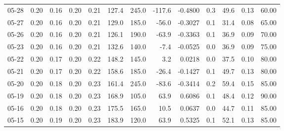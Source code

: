 \begin{threeparttable}
{\begin{tabular}{lrrrrrrrrrrrr}
  05-28 &          0.20 &          0.16 &          0.20 &        0.21 &               127.4 &               245.0 &     -117.6 &      -0.4800 &                 0.3 &             49.6 &            0.13 &                  60.00 \\
  05-27 &          0.20 &          0.16 &          0.20 &        0.21 &               129.0 &               185.0 &      -56.0 &      -0.3027 &                 0.1 &             31.4 &            0.08 &                  65.00 \\
  05-26 &          0.20 &          0.16 &          0.20 &        0.21 &               126.1 &               190.0 &      -63.9 &      -0.3363 &                 0.1 &             36.9 &            0.09 &                  70.00 \\
  05-23 &          0.20 &          0.16 &          0.20 &        0.21 &               132.6 &               140.0 &       -7.4 &      -0.0525 &                 0.0 &             36.9 &            0.09 &                  75.00 \\
  05-22 &          0.20 &          0.17 &          0.20 &        0.22 &               148.2 &               145.0 &        3.2 &       0.0218 &                 0.0 &             37.5 &            0.10 &                  80.00 \\
  05-21 &          0.20 &          0.17 &          0.20 &        0.22 &               158.6 &               185.0 &      -26.4 &      -0.1427 &                 0.1 &             49.7 &            0.13 &                  80.00 \\
  05-20 &          0.20 &          0.18 &          0.20 &        0.23 &               161.4 &               245.0 &      -83.6 &      -0.3414 &                 0.2 &             59.4 &            0.15 &                  85.00 \\
  05-19 &          0.20 &          0.18 &          0.20 &        0.23 &               168.9 &               105.0 &       63.9 &       0.6086 &                 0.1 &             48.4 &            0.12 &                  90.00 \\
  05-16 &          0.20 &          0.18 &          0.20 &        0.23 &               175.5 &               165.0 &       10.5 &       0.0637 &                 0.0 &             44.7 &            0.11 &                  85.00 \\
  05-15 &          0.20 &          0.19 &          0.20 &        0.23 &               183.9 &               120.0 &       63.9 &       0.5325 &                 0.1 &             52.1 &            0.13 &                  85.00 \\

\end{tabular}}
\end{threeparttable}
